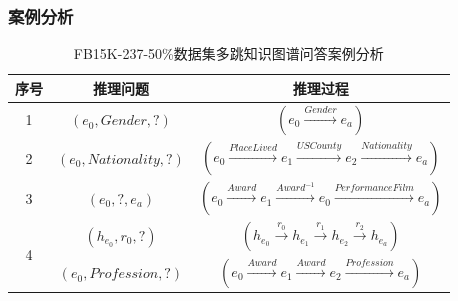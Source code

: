 \documentclass[algorithmlist, AutoFakeBold, AutoFakeSlant, figurelist, tablelist, nomlist, engineering]{seuthesix}
\begin{document}
\subsubsection{案例分析}
\begin{table}[t]
  \centering
  \caption{FB15K-237-50\%数据集多跳知识图谱问答案例分析}
  \begin{tabular*}{0.95\textwidth}{@{\extracolsep{\fill}}ccc}
    \toprule[1pt] 
    序号 & 推理问题 & 推理过程 \\ \hline
    1 & $(e_0, Gender, ?)$ & $(e_0 \xrightarrow{Gender} e_a)$ \\
    2 & $(e_0, Nationality, ?)$ & $(e_0 \xrightarrow{PlaceLived} e_1 \xrightarrow{USCounty} e_2 \xrightarrow{Nationality} e_a)$ \\
    3 & $(e_0, ?, e_a)$ & $(e_0 \xrightarrow{Award} e_1 \xrightarrow{Award^{-1}} e_0 \xrightarrow{PerformanceFilm} e_a) $ \\
    \multirow{2}{*}{4} & $(h_{e_0}, r_0, ?)$ & $(h_{e_0} \xrightarrow{r_0} h_{e_1} \xrightarrow{r_1} h_{e_2} \xrightarrow{r_2} h_{e_a})$ \\
    & $(e_0, Profession, ?)$ & $(e_0 \xrightarrow{Award} e_1 \xrightarrow{Award} e_2 \xrightarrow{Profession} e_a)$ \\
    \bottomrule[1pt]
  \end{tabular*}
  \label{Experiment2_CaseStudy}
\end{table}
\end{document}
